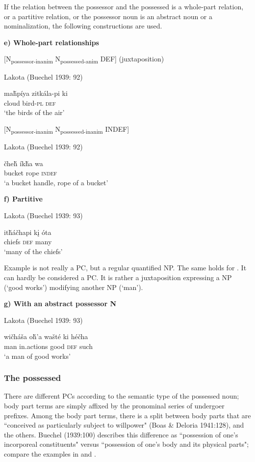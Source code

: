 \documentclass[output=paper]{LSP/langsci}
\begin{document}
If the relation between the possessor and the possessed is a whole-part relation, or a partitive relation, or the possessor noun is an abstract noun or a nominalization, the following constructions are used. 

\vspace{1em}
\textbf{e)	Whole-part relationships}

[N\textsubscript{possessor-inanim} N\textsubscript{possessed-anim} DEF] (juxtaposition)

\ea Lakota (Buechel 1939: 92)

\gll ma\v{h}píya zitkála-pi  ki  \\
cloud      bird-\textsc{pl} \textsc{def} \\
\glt `the birds of the air'
\z

[N\textsubscript{possessor-inanim} N\textsubscript{possessed-inanim} INDEF] 

\ea Lakota (Buechel 1939: 92)

\gll  \v{c}he\v{h} \'ik\v{h}a wa \\  
bucket rope \textsc{indef} \\
\glt `a bucket handle, rope of a bucket' 
\z 

\textbf{f)	Partitive}

\ea Lakota (Buechel 1939: 93) \label{lakotamanychiefs}

\gll it\v{h}\'a\v{c}hapi k\k{i} \'ota \\
chiefs \textsc{def} many \\
\glt `many of the chiefs'
\z

Example  is not really a PC, but a regular quantified NP. The same holds for . It can hardly be considered a PC. It is rather a juxtaposition expressing a NP (`good works') modifying another NP (`man').

\vspace{1em}

\textbf{g)	With an abstract possessor N}

\ea Lakota (Buechel 1939: 93) \label{lakotagoodworks}

\gll wi\v{c}háša o\v{h}'a     wašté ki     hé\v{c}ha \\
man       in.actions good  \textsc{def} such \\
\glt `a man of good works'
\z

\subsubsection{The possessed}
There are different PCs according to the semantic type of the possessed noun; body part terms are simply affixed by the pronominal series of undergoer prefixes. Among the body part terms, there is a split between body parts that are ``conceived as particularly subject to willpower" (Boas \& Deloria 1941:128), and the others. Buechel (1939:100) describes this difference as ``possession of one's incorporeal constituents" versus ``possession of one's body and its physical parts"; compare the examples in  and .
\end{document}
